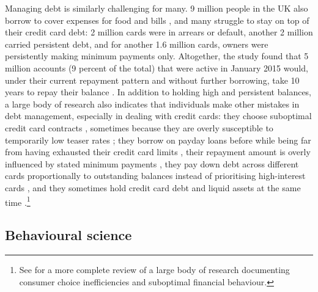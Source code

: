 


Managing debt is similarly challenging for many. 9 million people in the UK
also borrow to cover expenses for food and bills \citep{mps2018building}, and
many struggle to stay on top of their credit card debt: 2 million cards were in
arrears or default, another 2 million carried persistent debt, and for another
1.6 million cards, owners were persistently making minimum payments only.
Altogether, the study found that 5 million accounts (9 percent of the total)
that were active in January 2015 would, under their current repayment pattern
and without further borrowing, take 10 years to repay their balance
\citep{fca2016credit}. In addition to holding high and persistent balances, a
large body of research also indicates that individuals make other mistakes in
debt management, especially in dealing with credit cards: they choose
suboptimal credit card contracts \citep{agarwal2015consumers}, sometimes
because they are overly susceptible to temporarily low teaser rates
\citep{shui2004time, ausubel1991failure}; they borrow on payday loans before
while being far from having exhausted their credit card limits
\citep{agarwal2009payday}, their repayment amount is overly influenced by
stated minimum payments \citep{sakaguchi2022default}, they pay down debt across
different cards proportionally to outstanding balances instead of prioritising
high-interest cards \citep{gathergood2019individuals}, and they sometimes hold
credit card debt and liquid assets at the same time \citep{gross2002liquidity,
    gathergood2020co}.\footnote{See \citet{agarwal2017shapes} for a more
    complete review of a large body of research documenting consumer choice
inefficiencies and suboptimal financial behaviour.} 


\subsection{Behavioural science}%
\label{sub:role_of_behavioural_science}

